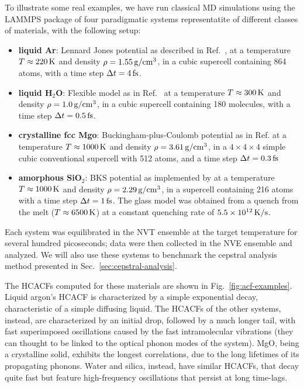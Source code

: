 \begin{LEtext}
To illustrate some real examples, we have run classical MD simulations using the \textsc{LAMMPS} package \cite{LAMMPS1995} of four paradigmatic systems representatite of different classes of materials, with the following setup:
\begin{itemize}
    \item \textbf{liquid Ar}: Lennard Jones potential as described in Ref.~\cite{Argon-FF}, at a temperature $T\approx 220\,\mathrm{K}$ and density $\rho=1.55\,\mathrm{g/cm^3}$, in a cubic supercell containing 864 atoms, with a time step $\Delta t=4\,\mathrm{fs}$.
    \item \textbf{liquid H$_2$O}: Flexible model as in Ref.~\cite{Water-FF} at a temperature $T\approx 300\,\mathrm{K}$ and density $\rho=1.0\,\mathrm{g/cm^3}$, in a cubic supercell containing 180 molecules, with a time step $\Delta t=0.5\,\mathrm{fs}$.
    \item \textbf{crystalline fcc Mgo}: Buckingham-plus-Coulomb potential as in Ref.  at a temperature $T\approx 1000\,\mathrm{K}$ and density $\rho=3.61\,\mathrm{g/cm^3}$, in a $4\times 4\times 4$ simple cubic conventional supercell with 512 atoms, and a time step $\Delta t=0.3\,\mathrm{fs}$
    \item \textbf{amorphous SiO$_2$}: BKS potential \cite{Silica-BKS-1990} as implemented by \citet{Silica-BKS-2015} at a temperature $T\approx 1000\,\mathrm{K}$ and density $\rho=2.29\,\mathrm{g/cm^3}$,  in a supercell containing 216 atoms with a time step $\Delta t=1\,\mathrm{fs}$. The glass model was obtained from a quench from the melt ($T\approx 6500\,\mathrm{K}$) at a constant quenching rate of $5.5\times 10^{12}\,\mathrm{K/s}$.
\end{itemize}
Each system was equilibrated in the NVT ensemble at the target temperature for several hundred picoseconds; data were then collected in the NVE ensemble and analyzed. 
We will also use these systems to benchmark the cepstral analysis method presented in Sec.~\ref{sec:cepstral-analysis}. 

The HCACFs computed for these materials are shown in Fig.~\ref{fig:acf-examples}. 
Liquid argon's HCACF is characterized by a simple exponential decay, characteristic of a simple diffusing liquid. The HCACFs of the other systems, instead, are characterized by an initial drop, followed by a much longer tail, with fast superimposed oscillations caused by the fast intramolecular vibrations (they can thought to be linked to the optical phonon modes of the system). MgO, being a crystalline solid, exhibits the longest correlations, due to the long lifetimes of its propagating phonons. Water and silica, instead, have similar HCACFs, that decay quite fast but feature high-frequency oscillations that persist at long time-lags.


\end{LEtext}
